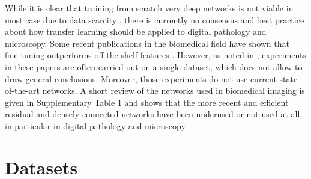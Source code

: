 While it is clear that training from scratch very deep networks is not viable in most case due to data scarcity \parencite{bayramoglu2016transfer,tajbakhsh2016convolutional}, there is currently no consensus and best practice about how transfer learning should be applied to digital pathology and microscopy. Some recent publications in the biomedical field have shown that fine-tuning outperforms off-the-shelf features \parencite{antony2016quantifying,kieffer2017convolutional,ravishankar2016understanding,shin2016deep}. However, as noted in \parencite{litjens2017survey}, experiments in these papers are often carried out on a single dataset, which does not allow to draw general conclusions. Moreover, those experiments do not use current state-of-the-art networks. A short review of the networks used in biomedical imaging is given in Supplementary Table 1 and shows that the more recent and efficient residual and densely connected networks have been underused or not used at all, in particular in digital pathology and microscopy.







\section{Datasets}
\label{sec:comp:datasets}


